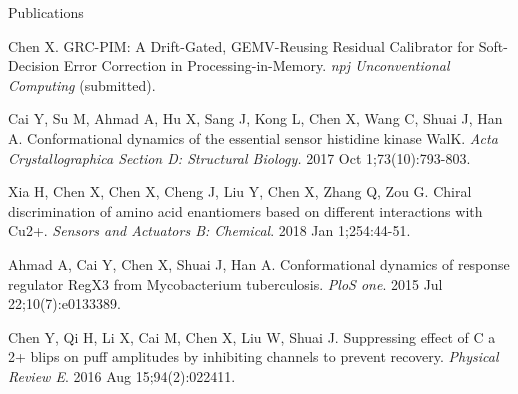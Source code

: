 \documentclass{resume} %
\begin{document}
\begin{rSection}{Publications}
\begin{rSubsection}{}{}
{}{}
  \item {Chen X. GRC-PIM: A Drift-Gated, GEMV-Reusing Residual Calibrator for Soft-Decision Error Correction in Processing-in-Memory. \textit{npj Unconventional Computing} (submitted).}\\
  \item {Cai Y, Su M, Ahmad A, Hu X, Sang J, Kong L, Chen X, Wang C, Shuai J, Han A. Conformational dynamics of the essential sensor histidine kinase WalK. \textit{Acta Crystallographica Section D: Structural Biology.} 2017 Oct 1;73(10):793-803.}\\
  \item {Xia H, Chen X, Chen X, Cheng J, Liu Y, Chen X, Zhang Q, Zou G. Chiral discrimination of amino acid enantiomers based on different interactions with Cu2+. \textit{Sensors and Actuators B: Chemical}. 2018 Jan 1;254:44-51.}\\
  \item {Ahmad A, Cai Y, Chen X, Shuai J, Han A. Conformational dynamics of response regulator RegX3 from Mycobacterium tuberculosis. \textit{PloS one}. 2015 Jul 22;10(7):e0133389.}\\
  \item {Chen Y, Qi H, Li X, Cai M, Chen X, Liu W, Shuai J. Suppressing effect of C a 2+ blips on puff amplitudes by inhibiting channels to prevent recovery. \textit{Physical Review E}. 2016 Aug 15;94(2):022411.}\\
\end{rSubsection}
\end{rSection}


\end{document}
